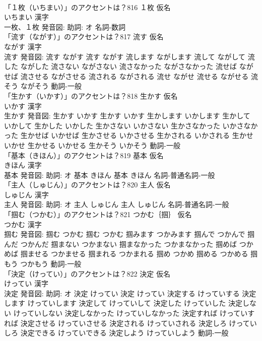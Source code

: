 \documentclass[8pt]{extreport}
\begin{document}
\begin{CJK}{UTF8}{min}
\\	「１枚（いちまい）」のアクセントは？816	１枚 仮名　
\\	いちまい 漢字　
\\	一枚、１枚 発音図: 助詞: オ							名詞-数詞 
\\	「流す（ながす）」のアクセントは？817	流す 仮名　
\\	ながす 漢字　
\\	流す 発音図:	流す ながす		流す ながす 流します ながします 流して ながして 流した ながした 流さない ながさない 流さなかった ながさなかった 流せば ながせば 流させる ながさせる 流される ながされる 流せ ながせ 流せる ながせる 流そう ながそう				動詞-一般 
\\	「生かす（いかす）」のアクセントは？818	生かす 仮名　
\\	いかす 漢字　
\\	生かす 発音図:	生かす いかす		生かす いかす 生かします いかします 生かして いかして 生かした いかした 生かさない いかさない 生かさなかった いかさなかった 生かせば いかせば 生かさせる いかさせる 生かされる いかされる 生かせ いかせ 生かせる いかせる 生かそう いかそう				動詞-一般 
\\	「基本（きほん）」のアクセントは？819	基本 仮名　
\\	きほん 漢字　
\\	基本 発音図: 助詞: オ	基本 きほん		基本 きほん				名詞-普通名詞-一般 
\\	「主人（しゅじん）」のアクセントは？820	主人 仮名　
\\	しゅじん 漢字　
\\	主人 発音図: 助詞: オ	主人 しゅじん		主人 しゅじん				名詞-普通名詞-一般 
\\	「掴む（つかむ）」のアクセントは？821	つかむ｛掴｝ 仮名　
\\	つかむ 漢字　
\\	掴む 発音図:	掴む つかむ		掴む つかむ 掴みます つかみます 掴んで つかんで 掴んだ つかんだ 掴まない つかまない 掴まなかった つかまなかった 掴めば つかめば 掴ませる つかませる 掴まれる つかまれる 掴め つかめ 掴める つかめる 掴もう つかもう				動詞-一般 
\\	「決定（けってい）」のアクセントは？822	決定 仮名　
\\	けってい 漢字　
\\	決定 発音図: 助詞: オ	決定 けってい		決定 けってい 決定する けっていする 決定します けっていします 決定して けっていして 決定した けっていした 決定しない けっていしない 決定しなかった けっていしなかった 決定すれば けっていすれば 決定させる けっていさせる 決定される けっていされる 決定しろ けっていしろ 決定できる けっていできる 決定しよう けっていしよう				動詞-一般 

\end{CJK}
\end{document}

